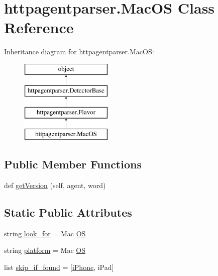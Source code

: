 \hypertarget{classhttpagentparser_1_1_mac_o_s}{}\section{httpagentparser.\+Mac\+OS Class Reference}
\label{classhttpagentparser_1_1_mac_o_s}
Inheritance diagram for httpagentparser.\+Mac\+OS\+:\begin{figure}[H]
\begin{center}
\leavevmode
\includegraphics[height=4.000000cm]{classhttpagentparser_1_1_mac_o_s}
\end{center}
\end{figure}
\subsection*{Public Member Functions}
\begin{DoxyCompactItemize}
\item 
def \hyperlink{classhttpagentparser_1_1_mac_o_s_ae088c256843ad145dc6ffa7acc35e99b}{get\+Version} (self, agent, word)
\end{DoxyCompactItemize}
\subsection*{Static Public Attributes}
\begin{DoxyCompactItemize}
\item 
string \hyperlink{classhttpagentparser_1_1_mac_o_s_ace9c37c9551d8c0ab5f95ff696c182e7}{look\+\_\+for} = \textquotesingle{}Mac \hyperlink{classhttpagentparser_1_1_o_s}{OS}\textquotesingle{}
\item 
string \hyperlink{classhttpagentparser_1_1_mac_o_s_a5b78e3283f6dfdb66c9abed2959934a9}{platform} = \textquotesingle{}Mac \hyperlink{classhttpagentparser_1_1_o_s}{OS}\textquotesingle{}
\item 
list \hyperlink{classhttpagentparser_1_1_mac_o_s_a87a33dff069765b738ccff6126268123}{skip\+\_\+if\+\_\+found} = \mbox{[}\textquotesingle{}\hyperlink{classhttpagentparser_1_1i_phone}{i\+Phone}\textquotesingle{}, \textquotesingle{}i\+Pad\textquotesingle{}\mbox{]}
\end{DoxyCompactItemize}
